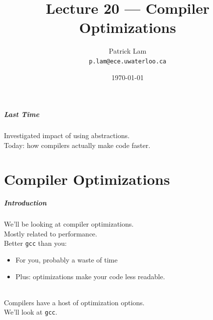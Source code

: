 

\title{Lecture 20 --- Compiler Optimizations }

\author{Patrick Lam \\ \small \texttt{p.lam@ece.uwaterloo.ca}}
\date{\today}




\begin{frame}
  \titlepage

 \end{frame}


\begin{frame}
  \frametitle{Last Time}
  
    Investigated impact of using abstractions.\\[1em]
    Today: how compilers actually make code faster.
  
\end{frame}

\part{Compiler Optimizations}
\frame{\partpage}

\begin{frame}
  \frametitle{Introduction}

  
    We'll be looking at compiler optimizations.\\[1em]
    Mostly related to performance.\\
    Better {\tt gcc} than you:
      \begin{itemize}
        \item For you, probably a waste of time
        \item Plus: optimizations make your code less readable.
      \end{itemize}
~\\

    Compilers have a host of optimization options.\\
     We'll look at {\tt gcc}.
  
\end{frame}

